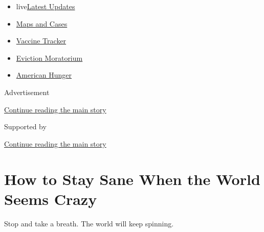 \begin{itemize}
\tightlist
\item
  live\href{https://www.nytimes3xbfgragh.onion/2020/09/05/world/coronavirus-covid.html?name=styln-coronavirus-national\&region=TOP_BANNER\&block=storyline_menu_recirc\&action=click\&pgtype=Article\&impression_id=061d7ca0-efbb-11ea-b9a5-71e5d1ca15bb\&variant=undefined}{Latest
  Updates}
\item
  \href{https://www.nytimes3xbfgragh.onion/interactive/2020/us/coronavirus-us-cases.html?name=styln-coronavirus-national\&region=TOP_BANNER\&block=storyline_menu_recirc\&action=click\&pgtype=Article\&impression_id=061d7ca1-efbb-11ea-b9a5-71e5d1ca15bb\&variant=undefined}{Maps
  and Cases}
\item
  \href{https://www.nytimes3xbfgragh.onion/interactive/2020/science/coronavirus-vaccine-tracker.html?name=styln-coronavirus-national\&region=TOP_BANNER\&block=storyline_menu_recirc\&action=click\&pgtype=Article\&impression_id=061d7ca2-efbb-11ea-b9a5-71e5d1ca15bb\&variant=undefined}{Vaccine
  Tracker}
\item
  \href{https://www.nytimes3xbfgragh.onion/2020/09/02/your-money/eviction-moratorium-covid.html?name=styln-coronavirus-national\&region=TOP_BANNER\&block=storyline_menu_recirc\&action=click\&pgtype=Article\&impression_id=061da3b0-efbb-11ea-b9a5-71e5d1ca15bb\&variant=undefined}{Eviction
  Moratorium}
\item
  \href{https://www.nytimes3xbfgragh.onion/interactive/2020/09/02/magazine/food-insecurity-hunger-us.html?name=styln-coronavirus-national\&region=TOP_BANNER\&block=storyline_menu_recirc\&action=click\&pgtype=Article\&impression_id=061da3b1-efbb-11ea-b9a5-71e5d1ca15bb\&variant=undefined}{American
  Hunger}
\end{itemize}

Advertisement

\protect\hyperlink{after-top}{Continue reading the main story}

Supported by

\protect\hyperlink{after-sponsor}{Continue reading the main story}

\hypertarget{how-to-stay-sane-when-the-world-seems-crazy}{%
\section{How to Stay Sane When the World Seems
Crazy}\label{how-to-stay-sane-when-the-world-seems-crazy}}

Stop and take a breath. The world will keep spinning.

